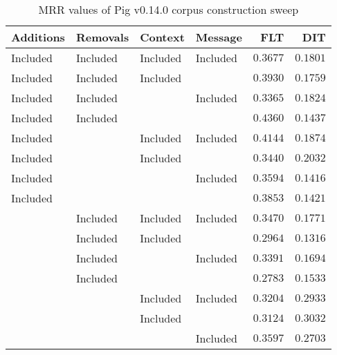 
\begin{table}
\begin{spacing}{1.2}
\centering
\caption{MRR values of Pig v0.14.0 corpus construction sweep}
\label{table:pig_corpus_sweep}
\vspace{0.2em}
\begin{tabular}{llll|rr}
\toprule
Additions &  Removals &   Context &   Message & FLT &        DIT \\
\midrule
 Included &  Included &  Included &  Included &         $0.3677$ &      $0.1801$ \\
 \myrowcolor Included &  Included &  Included &           &         $0.3930$ &      $0.1759$ \\
 Included &  Included &           &  Included &         $0.3365$ &      $0.1824$ \\
 Included &  Included &           &           &    $\bm{0.4360}$ &      $0.1437$ \\
 Included &           &  Included &  Included &         $0.4144$ &      $0.1874$ \\
 Included &           &  Included &           &         $0.3440$ &      $0.2032$ \\
 Included &           &           &  Included &         $0.3594$ &      $0.1416$ \\
 Included &           &           &           &         $0.3853$ &      $0.1421$ \\
          &  Included &  Included &  Included &         $0.3470$ &      $0.1771$ \\
          &  Included &  Included &           &         $0.2964$ &      $0.1316$ \\
          &  Included &           &  Included &         $0.3391$ &      $0.1694$ \\
          &  Included &           &           &         $0.2783$ &      $0.1533$ \\
          &           &  Included &  Included &         $0.3204$ &      $0.2933$ \\
          &           &  Included &           &         $0.3124$ & $\bm{0.3032}$ \\
          &           &           &  Included &         $0.3597$ &      $0.2703$ \\
\bottomrule
\end{tabular}

\end{spacing}
\end{table}

